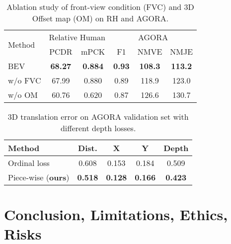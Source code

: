 \documentclass[10pt,twocolumn,letterpaper]{article}
\begin{document}
\begin{table}[t]
\footnotesize
\centering
	\begin{tabular}{l|cc|ccc}
	\toprule
	\multirow{2}{*}{ Method}  &  \multicolumn{2}{c|}{ Relative Human} & \multicolumn{3}{c}{ AGORA} \\
	\cline{2-6}
	& \multicolumn{1}{c}{PCDR} & \multicolumn{1}{c|}{mPCK} & \multicolumn{1}{c}{ F1} & \multicolumn{1}{c}{ NMVE} & \multicolumn{1}{c}{ NMJE} \\
    \midrule
    BEV & \textbf{68.27} & \textbf{0.884} & \textbf{0.93} & \textbf{108.3} & \textbf{113.2}\\ 
    { w/o FVC} & 67.99 & 0.880 & 0.89 & 118.9 & 123.0 \\
    { w/o OM} & 60.76 & 0.620 & 0.87 & 126.6 & 130.7 \\
	\bottomrule
    \end{tabular}
    \vspace{-2mm}
    \caption{Ablation study of front-view condition (FVC) and 3D Offset map (OM) on RH and AGORA.}\vspace{-2mm}
    \label{tab:ablation_study}
\end{table}

\begin{table}[t]
	\footnotesize
	\centering
	\begin{tabular}{l|c|ccc}
	\toprule
Method & Dist. & X & Y& Depth\\
\midrule
Ordinal loss~\cite{wang2020hmor} & 0.608 & 0.153 & 0.184 & 0.509 \\
Piece-wise  (\textbf{ours})  & \textbf{0.518} & \textbf{0.128} & \textbf{0.166} & \textbf{0.423} \\
\bottomrule
\end{tabular}
\vspace{-2mm}
	\caption{3D translation error on AGORA validation set with different depth losses.}\vspace{-2mm}
	\label{tab:Loss}
\end{table}


\vspace{-2mm}
\section{Conclusion, Limitations, Ethics, Risks}\vspace{-1mm}
\end{document}
